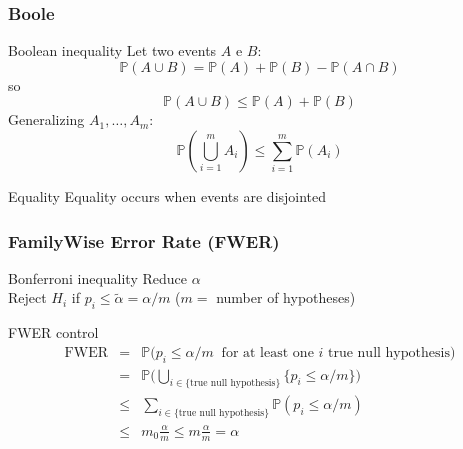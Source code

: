 \documentclass[xcolor={pdftex,dvipsnames,table}]{beamer}
\newcommand{\bb}[1]{\begin{block}{#1}}
\newcommand{\eb}{\end{block}}
\newcommand{\bfr}[1]{\begin{frame} \frametitle{#1}}
\begin{document}
\bfr{Boole}
  \bb{Boolean inequality}
    Let two events $A$ e $B$:
    \[ \mathbb{P}(A \cup B) = \mathbb{P}(A) + \mathbb{P}(B) - \mathbb{P}(A \cap B) \]
    so
    \[ \mathbb{P}(A \cup B) \leq \mathbb{P}(A) + \mathbb{P}(B) \]
    Generalizing $A_1, \ldots, A_m$:
    \[ \mathbb{P}(\bigcup_{i=1}^m A_i) \leq \sum_{i=1}^m \mathbb{P}(A_i) \]
  \eb
  \bb{Equality}
    Equality occurs when events are disjointed
  \eb
\end{frame}


\bfr{FamilyWise Error Rate (FWER)}


\bb{Bonferroni inequality}
     {Reduce $\alpha$} \\
    Reject $H_i$ if $p_i \leq \widetilde{\alpha} =\alpha/m$ ($m=$ number of hypotheses)
\eb
  \bb{FWER control}
    \begin{eqnarray*}
    \mathrm{FWER} &=& \mathbb{P} \big(p_i \leq \alpha/m\ \text{ for at least one $i$ true null hypothesis} \big) \\
    &=& \mathbb{P} \Big( \bigcup_{i\in \{\text{true null hypothesis}\}} \{p_i \leq \alpha/m\} \Big) \\
    &\leq& \sum_{i \in \{\text{true null hypothesis}\}} \mathbb{P} (p_i \leq \alpha/m) \\
    &\leq& m_0\frac{\alpha}{m} \leq m \frac{\alpha}{m}  = \alpha
    \end{eqnarray*}
  \eb
\end{frame}
% 
% 
% 
\end{document}
